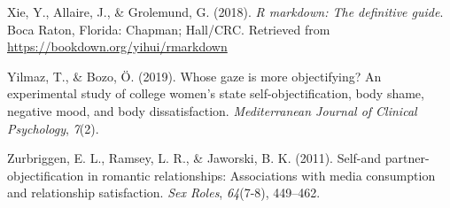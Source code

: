 \documentclass[man]{apa6}
\begin{document}
\hypertarget{ref-R-rmarkdown}{}
Xie, Y., Allaire, J., \& Grolemund, G. (2018). \emph{R markdown: The
definitive guide}. Boca Raton, Florida: Chapman; Hall/CRC. Retrieved
from \url{https://bookdown.org/yihui/rmarkdown}

\hypertarget{ref-yilmaz2019whose}{}
Yilmaz, T., \& Bozo, Ö. (2019). Whose gaze is more objectifying? An
experimental study of college women's state self-objectification, body
shame, negative mood, and body dissatisfaction. \emph{Mediterranean
Journal of Clinical Psychology}, \emph{7}(2).

\hypertarget{ref-zurbriggen2011self}{}
Zurbriggen, E. L., Ramsey, L. R., \& Jaworski, B. K. (2011). Self-and
partner-objectification in romantic relationships: Associations with
media consumption and relationship satisfaction. \emph{Sex Roles},
\emph{64}(7-8), 449--462.

\endgroup
\end{document}
